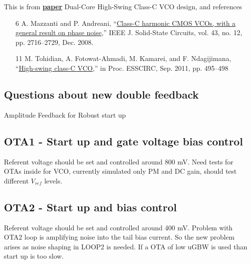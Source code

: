 This is from \href{https://www.semanticscholar.org/paper/Dual-Core-High-Swing-Class-C-VCO-design-Kim-Kim/c9551af0809604f76263af49976df9efc213bb8e}{\textbf{paper}} Dual-Core High-Swing Class-C VCO design, and references 


\begin{itemize}
	\item [6] A. Mazzanti and P. Andreani, “\href{https://ieeexplore.ieee.org/document/4684621}{Class-C harmonic CMOS
	VCOs, with a general result on phase noise},” IEEE J.
	Solid-State Circuits, vol. 43, no. 12, pp. 2716–2729,
	Dec. 2008.
	\item [11] M. Tohidian, A. Fotowat-Ahmadi, M. Kamarei, and F.
	Ndagijimana, “\href{https://ieeexplore.ieee.org/document/6045015}{High-swing class-C VCO},” in Proc.
	ESSCIRC, Sep. 2011, pp. 495–498
\end{itemize}


\subsection{Questions about new double feedback}


Amplitude Feedback for Robust start up



\subsection{OTA1 - Start up  and gate voltage bias control}

Referent voltage should be set and controlled around 800 mV. Need tests for OTAs inside for VCO, currently simulated only PM and DC gain, should test different $V_{ref}$ levels.

\subsection{OTA2 - Start up and bias control}

Referent voltage should be set and controlled around 400 mV. Problem with OTA2 loop is amplifying noise into the tail bias current. So the new problem arises as noise shaping in LOOP2 is needed. If a OTA of low uGBW is used than start up is too slow.


